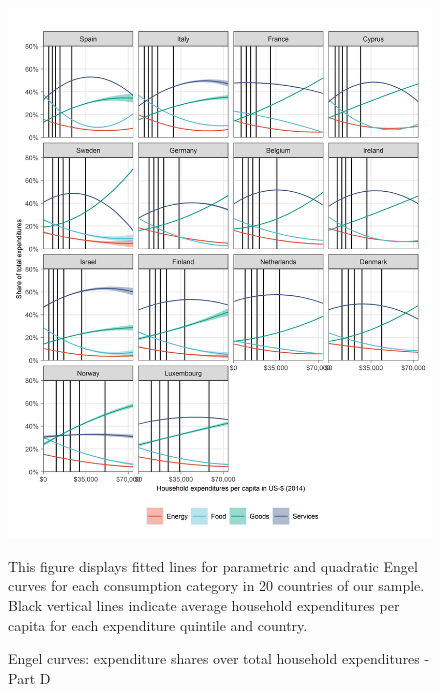 \documentclass[12pt, a4paper]{article}
\newenvironment{subcaption}
{\strut
\vspace{-5pt}
\begin{minipage}[b]{0.9\textwidth}
  \hspace*{-\parindent}
  \footnotesize}
 {\end{minipage}}
\begin{document}
\begin{figure}[ht!]
  \centering
  \caption{Engel curves: expenditure shares over total household expenditures - Part D} \label{fig:A4}
  \includegraphics{Analysis_Parametric_Engel_Curves/Parametric_EC_0_D}
  \begin{subcaption}
    This figure displays fitted lines for parametric and quadratic Engel curves for each consumption category in 20 countries of our sample. Black vertical lines indicate average household expenditures per capita for each expenditure quintile and country.
  \end{subcaption}

\end{figure}

\clearpage

\end{document}
